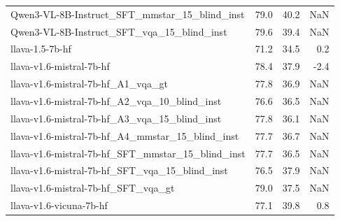 \begin{tabular}{lrrr}
Qwen3-VL-8B-Instruct_SFT_mmstar_15_blind_inst & 79.0 & 40.2 & NaN \\
Qwen3-VL-8B-Instruct_SFT_vqa_15_blind_inst & 79.6 & 39.4 & NaN \\
llava-1.5-7b-hf & 71.2 & 34.5 & 0.2 \\
llava-v1.6-mistral-7b-hf & 78.4 & 37.9 & -2.4 \\
llava-v1.6-mistral-7b-hf_A1_vqa_gt & 77.8 & 36.9 & NaN \\
llava-v1.6-mistral-7b-hf_A2_vqa_10_blind_inst & 76.6 & 36.5 & NaN \\
llava-v1.6-mistral-7b-hf_A3_vqa_15_blind_inst & 77.8 & 36.1 & NaN \\
llava-v1.6-mistral-7b-hf_A4_mmstar_15_blind_inst & 77.7 & 36.7 & NaN \\
llava-v1.6-mistral-7b-hf_SFT_mmstar_15_blind_inst & 77.7 & 36.5 & NaN \\
llava-v1.6-mistral-7b-hf_SFT_vqa_15_blind_inst & 76.5 & 37.9 & NaN \\
llava-v1.6-mistral-7b-hf_SFT_vqa_gt & 79.0 & 37.5 & NaN \\
llava-v1.6-vicuna-7b-hf & 77.1 & 39.8 & 0.8 \\
\bottomrule
\end{tabular}
